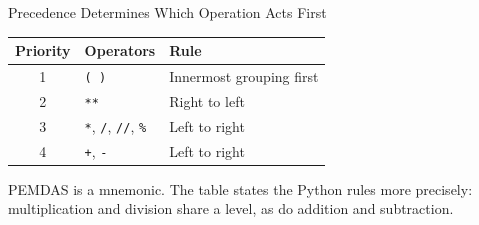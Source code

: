 \documentclass[aspectratio=169,10pt]{beamer}
\begin{document}
\begin{frame}{Precedence Determines Which Operation Acts First}

  \begin{center}

    \begin{tabular}{c l l}
      \textbf{Priority} & \textbf{Operators} & \textbf{Rule} \\
      \hline
      1 & \texttt{( )} & Innermost grouping first \\
      2 & \texttt{**} & Right to left \\
      3 & \texttt{*}, \texttt{/}, \texttt{//}, \texttt{\%} & Left to right \\
      4 & \texttt{+}, \texttt{-} & Left to right \\
    \end{tabular}

  \end{center}

  \vspace{0.12in}

  \begin{keyidea}

    PEMDAS is a mnemonic. The table states the Python rules more precisely: multiplication and division share a level, as do addition and subtraction.

  \end{keyidea}

\end{frame}
\end{document}
